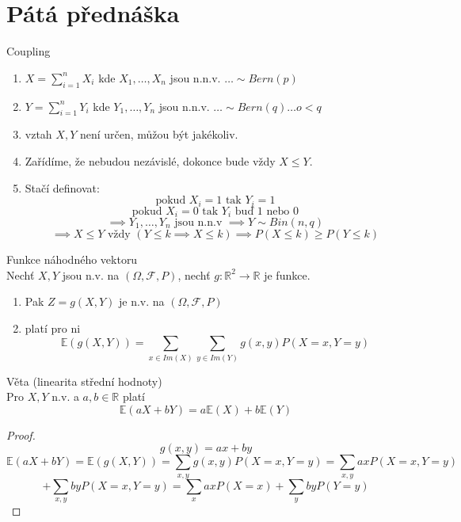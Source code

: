 \documentclass[../main.tex]{subfiles}
\begin{document}
\section{Pátá přednáška}

\begin{definition}
    Coupling
    \begin{enumerate}
        \item $X = \sum^n_{i=1} X_i$ kde $X_1,\dots , X_n$ jsou n.n.v. $\dots \sim Bern(p)$
        \item $Y = \sum^n_{i=1} Y_i$ kde $Y_1,\dots , Y_n$ jsou n.n.v. $\dots \sim Bern(q) \dots o < q$
        \item vztah $X,Y$ není určen, můžou být jakékoliv.
        \item Zařídíme, že nebudou nezávislé, dokonce bude vždy $X \leq Y$.
        \item Stačí definovat:
        \[\text{pokud } X_i = 1 \text{ tak } Y_i = 1\]
        \[\text{pokud } X_i = 0 \text{ tak } Y_i \text{ buď } 1 \text{ nebo }0\]
        \[\implies Y_1,\dots,Y_n \text{ jsou n.n.v } \implies Y \sim Bin(n,q)\]
        \[\implies X \leq Y \text{ vždy } (Y \leq k \implies X\leq k) \implies P(X\leq k) \geq P(Y\leq k)\]
    \end{enumerate}
\end{definition}

\begin{theorem}
    Funkce náhodného vektoru\\

    Nechť $X,Y$ jsou n.v. na $(\Omega,\mathcal{F},P)$, nechť $g:\mathbb{R}^2 \rightarrow \mathbb{R}$ je funkce.
    \begin{enumerate}
        \item Pak $Z = g(X,Y)$ je n.v. na $(\Omega,\mathcal{F},P)$
        \item platí pro ni
        \[\mathbb{E}(g(X,Y)) = \sum_{x\in Im(X)} \sum_{y\in Im(Y)} g(x,y)P(X=x,Y=y)\]
    \end{enumerate}

    Věta (linearita střední hodnoty)\\

    Pro $X,Y$ n.v. a $a,b \in \mathbb{R}$ platí
    \[\mathbb{E}(aX+bY) = a\mathbb{E}(X)+b\mathbb{E}(Y)\]
    \begin{proof}
        \[g(x,y) = ax+by\]
        \[\mathbb{E}(aX+bY) = \mathbb{E}(g(X,Y)) = \sum_{x,y} g(x,y) P(X=x,Y=y) = \sum_{x,y} axP(X=x,Y=y)\]
        \[+ \sum_{x,y}byP(X=x,Y=y) = \sum_{x}axP(X=x) + \sum_y byP(Y=y)\]
    \end{proof}
\end{theorem}
\end{document}
